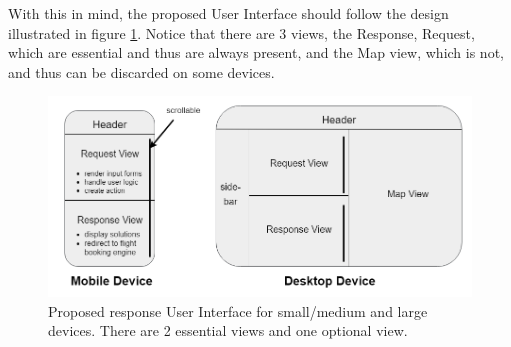 With this in mind, the proposed User Interface should follow the design illustrated in figure \ref{fig:UI_design}.
Notice that there are 3 views, the Response, Request, which are essential and thus are always present,
and the Map view, which is not, and thus can be discarded on some devices.


\begin{figure}[htpb]
  \centering
  \includegraphics[width=\textwidth]{./Figures/system_design/UI_design.png}
  \caption{Proposed response User Interface for small/medium and large devices. 
  There are 2 essential views and one optional view.}
  \label{fig:UI_design}
\end{figure}









